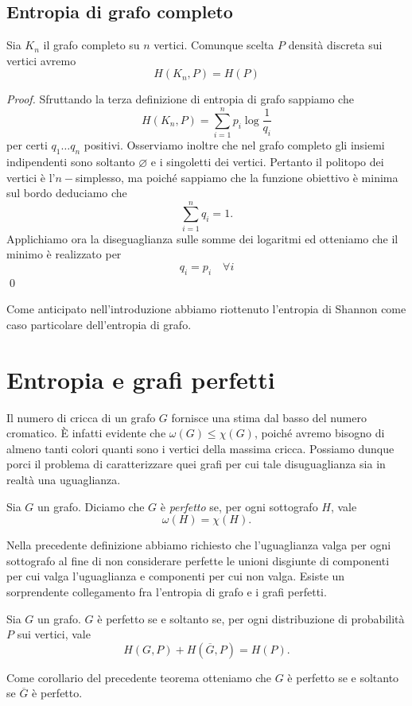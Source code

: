 \subsection{Entropia di grafo completo} 
\begin{proposition}
	Sia \(K_n\) il grafo completo su \(n\) vertici. Comunque scelta \(P\) densità discreta sui vertici avremo
	\[H(K_n,P)=H(P)\]
\end{proposition}
\begin{proof}
	Sfruttando la terza definizione di entropia di grafo sappiamo che
	\[H(K_n,P)=\sum_{i=1}^n p_i \log{\frac{1}{q_i}}\]
	per certi \(q_1\dots q_n\) positivi. Osserviamo inoltre che nel grafo completo gli insiemi indipendenti sono soltanto \(\varnothing\) e i singoletti dei vertici. Pertanto il politopo dei vertici è l'\(n-\)simplesso, ma poiché sappiamo che la funzione obiettivo è minima sul bordo deduciamo che
	\[\sum_{i=1}^n q_i = 1.\]
	Applichiamo ora la diseguaglianza sulle somme dei logaritmi ed otteniamo che il minimo è realizzato per
	\[q_i = p_i\quad \forall i\]
	\qed 
\end{proof}
\begin{remark}
	Come anticipato nell'introduzione abbiamo riottenuto l'entropia di Shannon come caso particolare dell'entropia di grafo. 
\end{remark}

\section{Entropia e grafi perfetti} Il numero di cricca di un grafo \(G\) fornisce una stima dal basso del numero cromatico. È infatti evidente che \(\omega(G)\le\chi(G)\), poiché avremo bisogno di almeno tanti colori quanti sono i vertici della massima cricca. Possiamo dunque porci il problema di caratterizzare quei grafi per cui tale disuguaglianza sia in realtà una uguaglianza. 
\begin{definition}
	Sia \(G\) un grafo. Diciamo che \(G\) è \emph{perfetto} se, per ogni sottografo \(H\), vale
	\[\omega(H)=\chi(H).\]
\end{definition}
Nella precedente definizione abbiamo richiesto che l'uguaglianza valga per ogni sottografo al fine di non considerare perfette le unioni disgiunte di componenti per cui valga l'uguaglianza e componenti per cui non valga. Esiste un sorprendente collegamento fra l'entropia di grafo e i grafi perfetti. 
\begin{theorem}
	 Sia \(G\) un grafo. \(G\) è perfetto se e soltanto se, per ogni distribuzione di probabilità \(P\) sui vertici, vale
	\[H\left(G,P\right)+H\left(\overline{G},P\right)=H(P).\]
\end{theorem}
Come corollario del precedente teorema otteniamo che \(G\) è perfetto se e soltanto se \(\overline{G}\) è perfetto.
  

